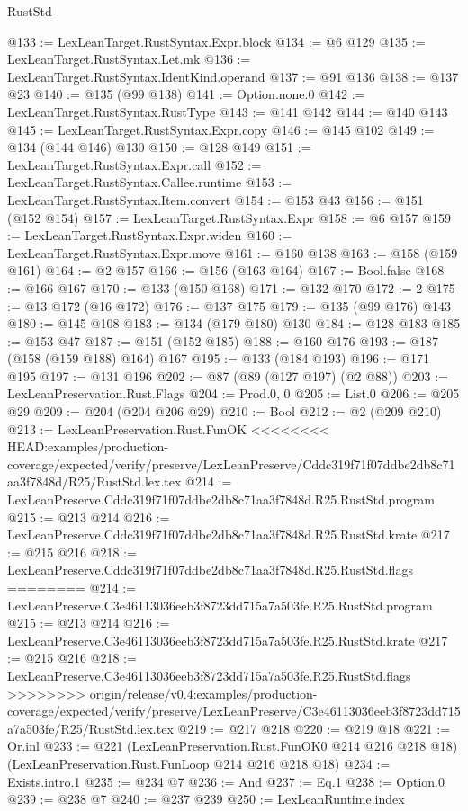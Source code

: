 \begin{lexlean}{RustStd}
\begin{coremodule}
{\begin{coremodule}
{{{{{@133 := LexLeanTarget.RustSyntax.Expr.block
@134 := @6 @129
@135 := LexLeanTarget.RustSyntax.Let.mk
@136 := LexLeanTarget.RustSyntax.IdentKind.operand
@137 := @91 @136
@138 := @137 @23
@140 := @135 (@99 @138)
@141 := Option.none.{0}
@142 := LexLeanTarget.RustSyntax.RustType
@143 := @141 @142
@144 := @140 @143
@145 := LexLeanTarget.RustSyntax.Expr.copy
@146 := @145 @102
@149 := @134 (@144 @146) @130
@150 := @128 @149
@151 := LexLeanTarget.RustSyntax.Expr.call
@152 := LexLeanTarget.RustSyntax.Callee.runtime
@153 := LexLeanTarget.RustSyntax.Item.convert
@154 := @153 @43
@156 := @151 (@152 @154)
@157 := LexLeanTarget.RustSyntax.Expr
@158 := @6 @157
@159 := LexLeanTarget.RustSyntax.Expr.widen
@160 := LexLeanTarget.RustSyntax.Expr.move
@161 := @160 @138
@163 := @158 (@159 @161)
@164 := @2 @157
@166 := @156 (@163 @164)
@167 := Bool.false
@168 := @166 @167
@170 := @133 (@150 @168)
@171 := @132 @170
@172 := 2
@175 := @13 @172 (@16 @172)
@176 := @137 @175
@179 := @135 (@99 @176) @143
@180 := @145 @108
@183 := @134 (@179 @180) @130
@184 := @128 @183
@185 := @153 @47
@187 := @151 (@152 @185)
@188 := @160 @176
@193 := @187 (@158 (@159 @188) @164) @167
@195 := @133 (@184 @193)
@196 := @171 @195
@197 := @131 @196
@202 := @87 (@89 (@127 @197) (@2 @88))
@203 := LexLeanPreservation.Rust.Flags
@204 := Prod.{0, 0}
@205 := List.{0}
@206 := @205 @29
@209 := @204 (@204 @206 @29)
@210 := Bool
@212 := @2 (@209 @210)
@213 := LexLeanPreservation.Rust.FunOK
<<<<<<<< HEAD:examples/production-coverage/expected/verify/preserve/LexLeanPreserve/Cddc319f71f07ddbe2db8c71aa3f7848d/R25/RustStd.lex.tex
@214 := LexLeanPreserve.Cddc319f71f07ddbe2db8c71aa3f7848d.R25.RustStd.program
@215 := @213 @214
@216 := LexLeanPreserve.Cddc319f71f07ddbe2db8c71aa3f7848d.R25.RustStd.krate
@217 := @215 @216
@218 := LexLeanPreserve.Cddc319f71f07ddbe2db8c71aa3f7848d.R25.RustStd.flags
========
@214 := LexLeanPreserve.C3e46113036eeb3f8723dd715a7a503fe.R25.RustStd.program
@215 := @213 @214
@216 := LexLeanPreserve.C3e46113036eeb3f8723dd715a7a503fe.R25.RustStd.krate
@217 := @215 @216
@218 := LexLeanPreserve.C3e46113036eeb3f8723dd715a7a503fe.R25.RustStd.flags
>>>>>>>> origin/release/v0.4:examples/production-coverage/expected/verify/preserve/LexLeanPreserve/C3e46113036eeb3f8723dd715a7a503fe/R25/RustStd.lex.tex
@219 := @217 @218
@220 := @219 @18
@221 := Or.inl
@233 := @221
    (LexLeanPreservation.Rust.FunOK0 @214 @216 @218 @18)
    (LexLeanPreservation.Rust.FunLoop @214 @216 @218 @18)
@234 := Exists.intro.{1}
@235 := @234 @7
@236 := And
@237 := Eq.{1}
@238 := Option.{0}
@239 := @238 @7
@240 := @237 @239
@250 := LexLeanRuntime.index
}}}}}
\end{coremodule}}
\end{coremodule}
\end{lexlean}
